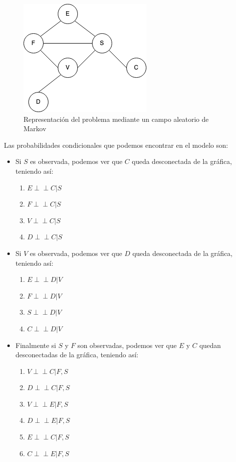 \documentclass[letterpaper,12pt]{article}
\theoremstyle{definition}
\begin{document}
\begin{figure}[H]
	\centering	
	\includegraphics{markov}
	\caption{Representación del problema mediante un campo aleatorio de Markov}	
\end{figure}

Las probabilidades condicionales que podemos encontrar en el modelo son:\\

\begin{itemize}
	\item Si \(S\) es observada, podemos ver que \(C\) queda desconectada de la gráfica, teniendo así:
	\begin{enumerate}
		\item \(E \perp\!\!\!\perp C|S \)
		\item \(F \perp\!\!\!\perp C|S \)
		\item \(V \perp\!\!\!\perp C|S \)
		\item \(D \perp\!\!\!\perp C|S \)
	\end{enumerate}
	
	\item Si \(V\) es observada, podemos ver que \(D\) queda desconectada de la gráfica, teniendo así:
	\begin{enumerate}
		\item \(E \perp\!\!\!\perp D|V \)
		\item \(F \perp\!\!\!\perp D|V \)
		\item \(S \perp\!\!\!\perp D|V \)
		\item \(C \perp\!\!\!\perp D|V \)
	\end{enumerate}

	\item Finalmente si  \(S\) y \(F\) son observadas, podemos ver que \(E\) y \(C\) quedan desconectadas de la gráfica, teniendo así:
	\begin{enumerate}
		\item \(V \perp\!\!\!\perp C|F,S \)
		\item \(D \perp\!\!\!\perp C|F,S \)
		\item \(V \perp\!\!\!\perp E|F,S \)
		\item \(D \perp\!\!\!\perp E|F,S \)
		\item \(E \perp\!\!\!\perp C|F,S \)
		\item \(C \perp\!\!\!\perp E|F,S \)
	\end{enumerate}
\end{itemize}
\end{document}
